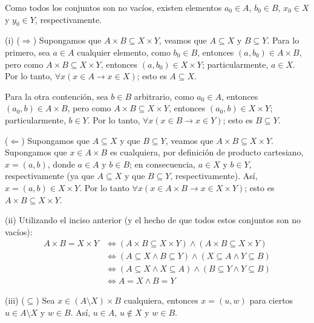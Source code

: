 \documentclass[letterpaper,DIV=14,headsepline,12pt]{scrartcl}
\makeatletter
\renewenvironment{proof}[1][]{%
        \par\pushQED{\qed}%
        \normalfont\topsep6pt \partopsep0pt %
        \trivlist
        \item[\hskip\labelsep
                \textbf{\textit{Demostración.}}%
        ]#1
        }{%
        \popQED\endtrivlist\@endpefalse
    }
\makeatother
\begin{document}
    \begin{proof}
        Como todos los conjuntos son no vacíos, existen elementos $a_0 \in A$, $b_0 \in B$, $x_0 \in X$ y $y_0 \in Y$, respectivamente.

        (i) ($\Rightarrow$) Supongamos que $A \times B \subseteq X \times Y$, veamos que $A \subseteq X$ y $B \subseteq Y$. Para lo primero, sea $a \in A$ cualquier elemento, como $b_0 \in B$, entonces $(a,b_0) \in A \times B$, pero como $A \times B \subseteq X \times Y$, entonces $(a,b_0) \in X \times Y$; particularmente, $a \in X$. Por lo tanto, $\forall x (x \in A \to x \in X)$; esto es $A \subseteq X$.

        Para la otra contención, sea $b \in B$ arbitrario, como $a_0 \in A$, entonces $(a_0,b) \in A \times B$, pero como $A \times B \subseteq X \times Y$, entonces $(a_0,b) \in X \times Y$; particularmente, $b \in Y$. Por lo tanto, $\forall x (x \in B \to x \in Y)$; esto es $B \subseteq Y$.

        ($\Leftarrow$) Supongamos que $A \subseteq X$ y que $B \subseteq Y$, veamos que $A \times B \subseteq X \times Y$. Supongamos que $x \in A \times B$ es cualquiera, por definición de producto cartesiano, $x=(a,b)$, donde $a \in A$ y $b \in B$; en consecuencia, $a \in X$ y $b \in Y$, respectivamente (ya que $A \subseteq X$ y que $B \subseteq Y$, respectivamente). Así, $x = (a,b) \in X \times Y$. Por lo tanto $\forall x (x \in A \times B \to x \in X \times Y)$; esto es $A \times B \subseteq X \times Y$.

        (ii) Utilizando el inciso anterior (y el hecho de que todos estos conjuntos son no vacíos):
        \begin{align*}
            A \times B = X \times Y & \Leftrightarrow (A \times B \subseteq X \times Y) \land (A \times B \subseteq X \times Y) \tag*{Doble contención} \\
            & \Leftrightarrow (A \subseteq X \land B \subseteq Y) \land (X \subseteq A \land Y \subseteq B) \tag*{Inciso anterior} \\
            & \Leftrightarrow (A \subseteq X \land X \subseteq A) \land (B \subseteq Y \land Y \subseteq B) \tag*{Equivalencias lógicas} \\
            & \Leftrightarrow A = X \land B=Y \tag*{Doble contención}
        \end{align*}

        (iii) ($\subseteq$) Sea $x \in (A \setminus X) \times B$ cualquiera, entonces $x=(u,w)$ para ciertos $u \in A \setminus X$ y $w \in B$. Así, $u \in A$, $u \notin X$ y $w \in B$.


\end{proof}
\end{document}
